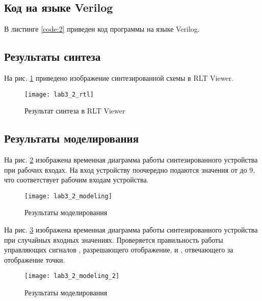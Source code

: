 \newpage

\subsection{Код на языке Verilog}

В листинге \ref{code:2} приведен код программы на языке Verilog.



\newpage

\subsection{Результаты синтеза}

На рис. \ref{fig:lab3_2_rtl} приведено изображение синтезированной схемы в RLT Viewer.

\begin{figure}[H]
\begin{center}
	\texttt{[image: lab3\_2\_rtl]}
	\caption{Результат синтеза в RLT Viewer}
	\label{fig:lab3_2_rtl}
\end{center}
\end{figure}

\newpage

\subsection{Результаты моделирования}
\label{sec:lab3_2_modeling}

На рис. \ref{fig:lab3_2_modeling} изображена временная диаграмма работы синтезированного устройства при рабочих входах. На вход устройству поочередно подаются значения от  до {9}, что соответствует рабочим входам устройства.

\begin{figure}[H]
\begin{center}
	\texttt{[image: lab3\_2\_modeling]}
	\caption{Результаты моделирования }
	\label{fig:lab3_2_modeling}
\end{center}
\end{figure}

На рис. \ref{fig:lab3_2_modeling_2} изображена временная диаграмма работы синтезированного устройства при случайных входных значениях. Проверяется правильность работы управляющих сигналов , разрешающего отображение, и , отвечающего за отображение точки.

\begin{figure}[H]
\begin{center}
	\texttt{[image: lab3\_2\_modeling\_2]}
	\caption{Результаты моделирования}
	\label{fig:lab3_2_modeling_2}
\end{center}
\end{figure}

